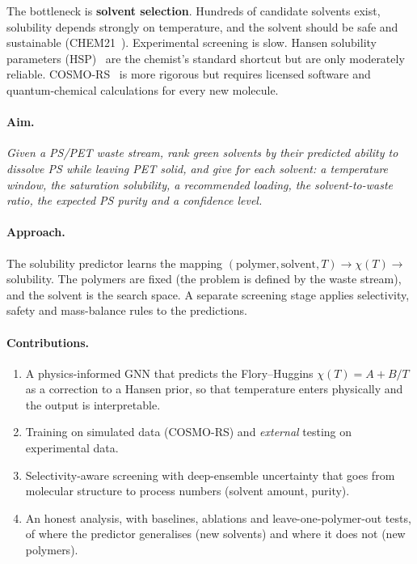 \documentclass[11pt,a4paper]{article}
\begin{document}
The bottleneck is \textbf{solvent selection}. Hundreds of candidate solvents exist, solubility depends
strongly on temperature, and the solvent should be safe and sustainable (CHEM21~\cite{chem21}).
Experimental screening is slow. Hansen solubility parameters (HSP)~\cite{hansen} are the chemist's
standard shortcut but are only moderately reliable. COSMO-RS~\cite{cosmors} is more rigorous but requires
licensed software and quantum-chemical calculations for every new molecule.

\paragraph{Aim.} \emph{Given a PS/PET waste stream, rank green solvents by their predicted ability to
dissolve PS while leaving PET solid, and give for each solvent: a temperature window, the saturation
solubility, a recommended loading, the solvent-to-waste ratio, the expected PS purity and a confidence
level.}

\paragraph{Approach.} The solubility predictor learns the mapping
$(\text{polymer},\text{solvent},T)\rightarrow\chi(T)\rightarrow$ solubility. The polymers are fixed (the
problem is defined by the waste stream), and the solvent is the search space. A separate screening stage
applies selectivity, safety and mass-balance rules to the predictions.

\paragraph{Contributions.}
\begin{enumerate}
\item A physics-informed GNN that predicts the Flory--Huggins $\chi(T)=A+B/T$ as a correction to a Hansen
prior, so that temperature enters physically and the output is interpretable.
\item Training on simulated data (COSMO-RS) and \emph{external} testing on experimental data.
\item Selectivity-aware screening with deep-ensemble uncertainty that goes from molecular structure to
process numbers (solvent amount, purity).
\item An honest analysis, with baselines, ablations and leave-one-polymer-out tests, of where the
predictor generalises (new solvents) and where it does not (new polymers).
\end{enumerate}
\end{document}
